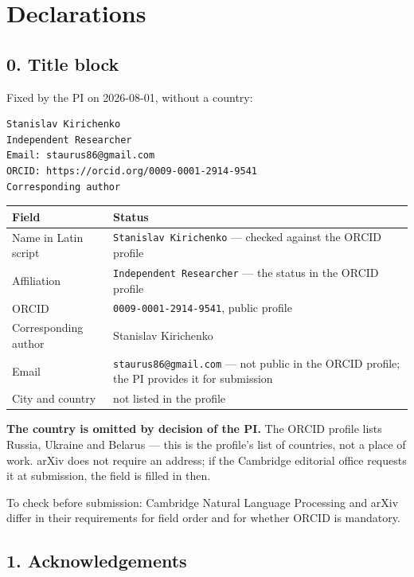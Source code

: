 \documentclass[11pt,a4paper]{article}
\renewcommand{\_}{\textunderscore\allowbreak}
\begin{document}
\section{Declarations}

\subsection{0. Title block}

Fixed by the PI on 2026-08-01, without a country:

\begin{verbatim}
Stanislav Kirichenko
Independent Researcher
Email: staurus86@gmail.com
ORCID: https://orcid.org/0009-0001-2914-9541
Corresponding author
\end{verbatim}

\begin{center}
\small
\begin{tabularx}{\textwidth}{lX}
\toprule
Field & Status \\
\midrule
Name in Latin script & \texttt{Stanislav Kirichenko} — checked against the ORCID profile \\
Affiliation & \texttt{Independent Researcher} — the status in the ORCID profile \\
ORCID & \texttt{0009-\allowbreak{}0001-\allowbreak{}2914-\allowbreak{}9541}, public profile \\
Corresponding author & Stanislav Kirichenko \\
Email & \texttt{staurus86@gmail.com} — not public in the ORCID profile; the PI provides it for submission \\
City and country & not listed in the profile \\
\bottomrule
\end{tabularx}
\end{center}

\textbf{The country is omitted by decision of the PI.} The ORCID profile lists Russia,
Ukraine and Belarus — this is the profile's list of countries, not a place of work.
arXiv does not require an address; if the Cambridge editorial office requests it at
submission, the field is filled in then.

To check before submission: Cambridge Natural Language Processing and arXiv differ
in their requirements for field order and for whether ORCID is mandatory.

\subsection{1. Acknowledgements}
\end{document}
